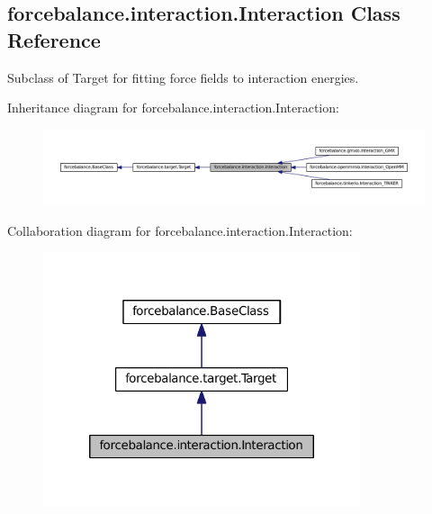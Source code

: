 \hypertarget{classforcebalance_1_1interaction_1_1Interaction}{\subsection{forcebalance.\-interaction.\-Interaction \-Class \-Reference}
\label{classforcebalance_1_1interaction_1_1Interaction}
}


\-Subclass of \-Target for fitting force fields to interaction energies.  




\-Inheritance diagram for forcebalance.\-interaction.\-Interaction\-:
\nopagebreak
\begin{figure}[H]
\begin{center}
\leavevmode
\includegraphics[width=350pt]{classforcebalance_1_1interaction_1_1Interaction__inherit__graph}
\end{center}
\end{figure}


\-Collaboration diagram for forcebalance.\-interaction.\-Interaction\-:
\nopagebreak
\begin{figure}[H]
\begin{center}
\leavevmode
\includegraphics[width=264pt]{classforcebalance_1_1interaction_1_1Interaction__coll__graph}
\end{center}
\end{figure}
